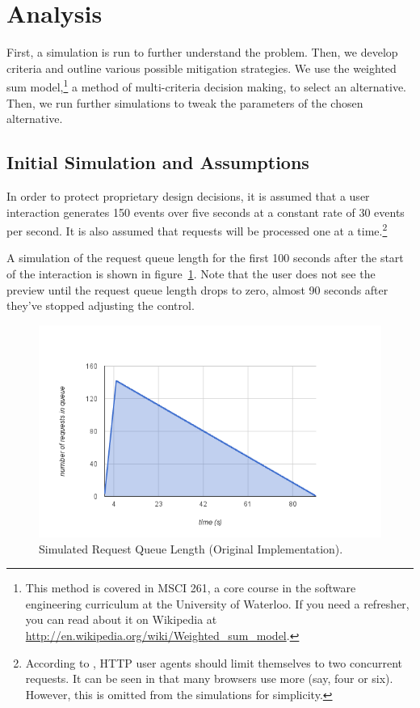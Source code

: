 \documentclass[se,resubmit]{uw-wkrpt}
\begin{document}
\section{Analysis}
First, a simulation is run to further understand the problem. Then, we
develop criteria and outline various possible mitigation strategies. We use
the weighted sum model,\footnote{This method is covered in MSCI 261, a core
course in the software engineering curriculum at the University of
Waterloo. If you need a refresher, you can read about it on Wikipedia at
\url{http://en.wikipedia.org/wiki/Weighted_sum_model}.} a method of
multi-criteria decision making, to select an alternative. Then, we run
further simulations to tweak the parameters of the chosen alternative.

\subsection{Initial Simulation and Assumptions}
In order to protect proprietary design decisions, it is assumed that a
user interaction generates 150 events over five seconds at a constant rate
of 30 events per second. It is also assumed that requests will be
processed one at a time.\footnote{According to \cite{ref:http}, HTTP user
agents should limit themselves to two concurrent requests. It can be seen
in \cite{ref:b423377} that many browsers use more (say, four or six).
However, this is omitted from the simulations for simplicity.}

A simulation of the request queue length for the first 100 seconds after
the start of the interaction is shown in figure~\ref{fig:sim-orig}. Note
that the user does not see the preview until the request queue length drops
to zero, almost 90 seconds after they've stopped adjusting the control.

\begin{figure}
  \centering
  \includegraphics[width=6.25in]{sim-orig}
  \caption{Simulated Request Queue Length (Original Implementation).}
  \label{fig:sim-orig}
\end{figure}
\end{document}
